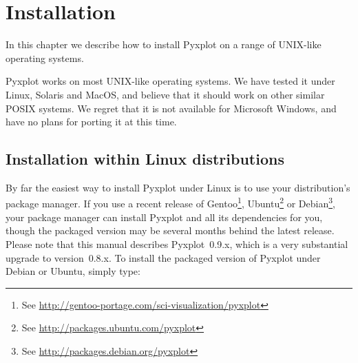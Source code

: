 %
%
%
%
%



\chapter{Installation}

\label{ch:installation}

In this chapter we describe how to install Pyxplot on a range of UNIX-like
operating systems.

Pyxplot works on most UNIX-like operating systems. We have tested it under
Linux, Solaris and MacOS, and believe that it
should work on other similar POSIX systems. We regret that it is not available
for Microsoft Windows, and have no plans for porting it at this time.

\section{Installation within Linux distributions}

By far the easiest way to install Pyxplot under Linux is to use your
distribution's package manager.  If you use a recent release of
Gentoo\footnote{See
\url{http://gentoo-portage.com/sci-visualization/pyxplot}}, Ubuntu\footnote{See
\url{http://packages.ubuntu.com/pyxplot}} or Debian\footnote{See
\url{http://packages.debian.org/pyxplot}}, your package manager can install
Pyxplot and all its dependencies for you, though the packaged version may be
several months behind the latest release. Please note that this manual
describes Pyxplot~0.9.x, which is a very substantial upgrade to version~0.8.x.
To install the packaged version of Pyxplot under Debian or Ubuntu, simply type:

